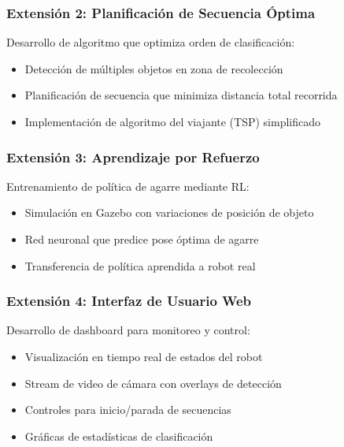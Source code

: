 \subsubsection{Extensión 2: Planificación de Secuencia Óptima}

Desarrollo de algoritmo que optimiza orden de clasificación:
\begin{itemize}
    \item Detección de múltiples objetos en zona de recolección
    \item Planificación de secuencia que minimiza distancia total recorrida
    \item Implementación de algoritmo del viajante (TSP) simplificado
\end{itemize}

\subsubsection{Extensión 3: Aprendizaje por Refuerzo}

Entrenamiento de política de agarre mediante RL:
\begin{itemize}
    \item Simulación en Gazebo con variaciones de posición de objeto
    \item Red neuronal que predice pose óptima de agarre
    \item Transferencia de política aprendida a robot real
\end{itemize}

\subsubsection{Extensión 4: Interfaz de Usuario Web}

Desarrollo de dashboard para monitoreo y control:
\begin{itemize}
    \item Visualización en tiempo real de estados del robot
    \item Stream de video de cámara con overlays de detección
    \item Controles para inicio/parada de secuencias
    \item Gráficas de estadísticas de clasificación
\end{itemize}
